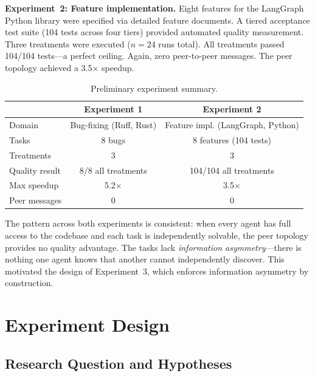 \documentclass[11pt,letterpaper]{article}
\begin{document}
\textbf{Experiment~2: Feature implementation.}
Eight features for the LangGraph Python library were specified via
detailed feature documents. A tiered acceptance test suite (104 tests
across four tiers) provided automated quality measurement. Three
treatments were executed ($n = 24$ runs total). All treatments passed
104/104 tests---a perfect ceiling. Again, zero peer-to-peer messages.
The peer topology achieved a 3.5$\times$ speedup.

\begin{table}[t]
  \caption{Preliminary experiment summary.}
  \label{tab:prelim}
  \centering\small
  \begin{tabular}{lcc}
    \toprule
    & \textbf{Experiment 1} & \textbf{Experiment 2} \\
    \midrule
    Domain         & Bug-fixing (Ruff, Rust) & Feature impl. (LangGraph, Python) \\
    Tasks          & 8 bugs                  & 8 features (104 tests) \\
    Treatments     & 3                       & 3 \\
    Quality result & 8/8 all treatments      & 104/104 all treatments \\
    Max speedup    & 5.2$\times$             & 3.5$\times$ \\
    Peer messages  & 0                       & 0 \\
    \bottomrule
  \end{tabular}
\end{table}

The pattern across both experiments is consistent: when every agent has
full access to the codebase and each task is independently solvable,
the peer topology provides no quality advantage. The tasks lack
\emph{information asymmetry}---there is nothing one agent knows that
another cannot independently discover. This motivated the design of
Experiment~3, which enforces information asymmetry by construction.


\section{Experiment Design}
\label{sec:design}

\subsection{Research Question and Hypotheses}
\end{document}
